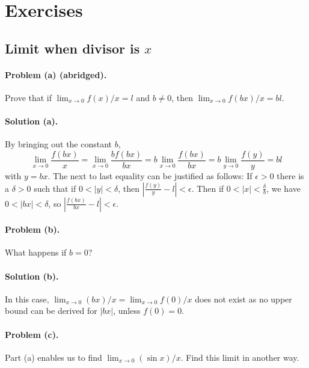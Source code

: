 \documentclass{article}
\begin{document}
\section{Exercises}

\setcounter{subsection}{13}
\subsection{Limit when divisor is $x$}

\paragraph{Problem (a) (abridged).} Prove that if $\lim_{x \rightarrow 0}
f(x)/x = l$ and $b \neq 0$, then $\lim_{x \rightarrow 0}f(bx)/x = bl$.

\paragraph{Solution (a).} By bringing out the constant $b$, \begin{equation*}
  \lim_{x \rightarrow 0}\frac{f(bx)}{x} = \lim_{x \rightarrow 0}
    \frac{bf(bx)}{bx} = b\lim_{x \rightarrow 0}\frac{f(bx)}{bx} =
    b\lim_{y \rightarrow 0}\frac{f(y)}{y} = bl
\end{equation*} with $y = bx$.
The next to last equality can be justified as follows: If $\epsilon > 0$ there
is a $\delta > 0$ such that if $0 < |y| < \delta$, then $\left|\frac{f(y)}{y} -
l\right| < \epsilon$. Then if $0 < |x| < \frac{\delta}{b}$, we have $0 < |bx| <
\delta$, so $\left|\frac{f(bx)}{bx} - l\right| < \epsilon$.

\paragraph{Problem (b).} What happens if $b = 0$?

\paragraph{Solution (b).} In this case, $\lim_{x \rightarrow 0} (bx)/x =
\lim_{x \rightarrow 0} f(0)/x$ does not exist as no upper bound can be derived
for $|bx|$, unless $f(0) = 0$.

\paragraph{Problem (c).} Part (a) enables us to find $\lim_{x \rightarrow 0}
(\sin{x})/x$. Find this limit in another way.
\end{document}
